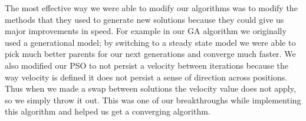 \documentclass[a4paper]{article}
\begin{document}
The most effective way we were able to modify our algorithms was to modify the methods that they used to generate new solutions because they could give us major improvements in speed. For example in our GA algorithm we originally used a generational model; by switching to a steady state model we were able to pick much better parents for our next generations and converge much faster. We also modified our PSO to not persist a velocity between iterations because the way velocity is defined it does not persist a sense of direction across positions. Thus when we made a swap between solutions the velocity value does not apply, so we simply throw it out. This was one of our breakthroughs while implementing this algorithm and helped us get a converging algorithm.



\printbibliography






\end{document}
